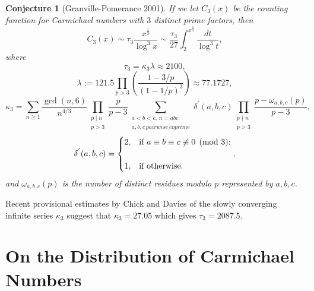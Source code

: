 \documentclass[11pt]{article}
\theoremstyle{plain}
\newtheorem{conj}[subsubsection]{Conjecture}
\theoremstyle{definition}
\theoremstyle{remark}
\numberwithin{equation}{subsection}
\begin{document}
\begin{conj}[Granville-Pomerance 2001] \label{carm5}
If we let $C_3(x)$ be the counting function for Carmichael numbers with $3$ distinct prime factors, then
\begin{equation} \label{16}
C_3(x)
			\sim {\tau_3} \frac{ x^{\frac{1}{3}} }{\log^3 x}
			\sim \frac{\tau_3}{27} \int_2^{x^{\frac{1}{3}}} \frac{dt}{\log^3 t},
\end{equation}
where
\begin{equation} \label{17}
\tau_3 = {\kappa_3}{\lambda} \approx 2100,
\end{equation}
\begin{equation} \label{18}
\lambda := {121.5}{\prod_{p>3}}\left(\frac{1-{3/p}}{(1-{1/p})^3}\right) \approx 77.1727,
\end{equation}
\begin{equation} \label{19}
\kappa_3 = {\sum_{n \ge 1}}
		{\frac{\gcd(n,6)}{n^{4/3}}}
		{\prod_{\substack{{p \mid n}\\{p > 3}}}}
		{\frac{p}{p-3}}
		{\sum_{\substack{{a<b<c, \,n=abc}\\{a,b,c \, pairwise \, coprime}}}}
		{\delta^{'}(a,b,c)}
		{\prod_{\substack{{p\nmid n}\\p>3}}}
		{\frac{p-{\omega_{a,b,c}{(p)}}}{p-3}},
\end{equation}
\begin{equation} \label{20}
\delta^{'}(a,b,c) = \begin{cases}  2, & $if {$a \equiv b \equiv c \not\equiv 0 \pmod 3$}$; \\
\\
1, & $if otherwise.$
\end{cases},
\end{equation}
and $\omega_{a,b,c}(p)$ is the number of distinct residues modulo $p$ represented by $a,b,c$.
\end{conj}
\indent Recent provisional estimates by Chick and Davies \cite{14} of the slowly converging infinite series $\kappa_3$ suggest that $\kappa_3 = 27.05$ which gives $\tau_3 = 2087.5$.
\section{On the Distribution of Carmichael Numbers}
\end{document}
